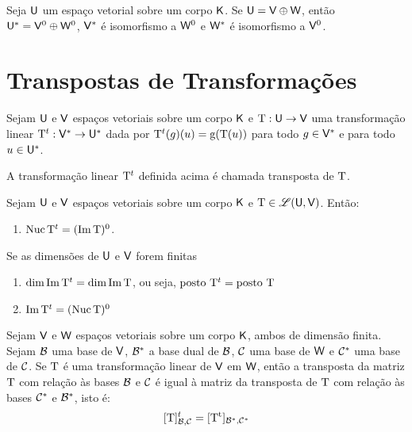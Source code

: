 \documentclass[10pt,a4paper]{book}
\begin{document}
\begin{theorem}
	Seja $\mathsf{ U }$ um espaço vetorial sobre um corpo $\mathsf{ K }$. Se $\mathsf{ U } = \mathsf{ V } \oplus \mathsf{ W }$, então $\mathsf{ U } ^ * = \mathsf{ V } ^ 0 \oplus \mathsf{ W } ^ 0$, $\mathsf{ V }  ^ *$ é isomorfismo a $\mathsf{ W } ^ 0$ e $\mathsf{ W }  ^ *$ é isomorfismo a $\mathsf{ V } ^ 0$.
\end{theorem}




\section{Transpostas de Transformações}

\begin{theorem}
	Sejam $\mathsf{ U }$ e $\mathsf{ V }$ espaços vetoriais sobre um corpo $\mathsf{ K }$ e $\mathrm{ T } : \mathsf{ U } \rightarrow \mathsf{ V }$ uma transformação linear $\mathrm{ T } ^ t : \mathsf{ V } ^ * \rightarrow \mathsf{ U } ^ *$ dada por $\mathrm{ T } ^ t(g)(u) = \mathrm{ g }(\mathrm{ T }(u))$ para todo $g \in \mathsf{ V } ^ *$ e para todo $u \in \mathsf{ U } ^ *$.
\end{theorem}

\begin{definition}
	A transformação linear $\mathrm{ T } ^ t$ definida acima é chamada transposta de $\mathrm{ T }$.
\end{definition}

\begin{theorem}
	Sejam $\mathsf{ U }$ e $\mathsf{ V }$ espaços vetoriais sobre um corpo $\mathsf{ K }$ e $\mathrm{ T } \in \mathscr{ L }(\mathsf{ U }, \mathsf{ V })$. Então:
	\begin{enumerate}
		\item $\mathrm{ Nuc }\, \mathrm{ T } ^ t = (\mathrm{ Im }\, \mathrm{ T }) ^ 0$.
	\end{enumerate}
	Se as dimensões de $\mathsf{ U }$ e $\mathsf{ V }$ forem finitas
	\begin{enumerate}
		\item $\dim \mathrm{ Im }\, \mathrm{ T } ^ t = \dim \mathrm{ Im }\, \mathrm{ T }$, ou seja, $\text{posto } \mathrm{ T } ^ t = \text{posto }\mathrm{ T }$
		\item $\mathrm{ Im }\, \mathrm{ T } ^ t = (\mathrm{ Nuc }\, \mathrm{ T }) ^ 0$
	\end{enumerate}
\end{theorem}

\begin{theorem}
	Sejam $\mathsf{ V }$ e $\mathsf{ W }$ espaços vetoriais sobre um corpo $\mathsf{ K }$, ambos de dimensão finita. Sejam $\mathcal{ B }$ uma base de $\mathsf{ V }$, $\mathcal{ B } ^ *$ a base dual de $\mathcal{ B }$, $\mathcal{ C }$ uma base de $\mathsf{ W }$ e $\mathcal{ C } ^ *$ uma base de $\mathcal{ C }$. Se $\mathrm{ T }$ é uma transformação linear de $\mathsf{ V }$ em $\mathsf{ W }$, então a transposta da matriz $\mathrm{ T }$ com relação às bases $\mathcal{ B }$ e $\mathcal{ C }$ é igual à matriz da transposta de $\mathrm{ T }$ com relação às bases $\mathcal{ C } ^ *$ e $\mathcal{ B } ^ *$, isto é:
	\[
		[\mathrm{ T }]_{\mathcal{ B }, \mathcal{ C }} ^ t = [\mathrm{ T ^ t}]_{\mathcal{ B } ^ *, \mathcal{ C } ^ *}
	\]
\end{theorem}
\end{document}
